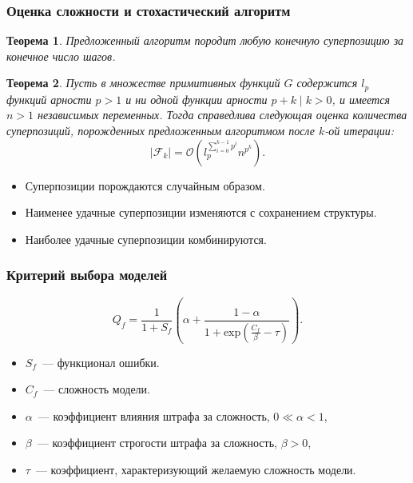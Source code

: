 \documentclass{beamer}
\newtheorem{theo}{Теорема}
\begin{document}
\begin{frame}
  \frametitle{Оценка сложности и стохастический алгоритм}
  
  \begin{theo}
	Предложенный алгоритм породит любую конечную суперпозицию за конечное число шагов.
  \end{theo}

  \begin{theo}
	Пусть в множестве примитивных функций $G$ содержится $l_p$ функций арности
	$p > 1$ и ни одной функции арности $p + k \mid k > 0$, и имеется $n > 1$
	независимых переменных. Тогда справедлива следующая оценка количества
	суперпозиций, порожденных предложенным алгоритмом после $k$-ой итерации:
	\[
	| \mathcal{F}_k | = \mathcal{O} (l_p^{\sum_{i=0}^{k-1} p^i} n^{p^k}).
	\]
  \end{theo}

  \begin{itemize}
	\item Суперпозиции порождаются случайным образом.
	\item Наименее удачные суперпозиции изменяются с сохранением структуры.
	\item Наиболее удачные суперпозиции комбинируются.
  \end{itemize}
\end{frame}

\begin{frame}
  \frametitle{Критерий выбора моделей}

  \[
  Q_f = \frac{1}{1 + S_f} \left(\alpha + \frac{1 - \alpha}{1 + \text{exp} (\frac{C_f}{\beta} - \tau)}\right).
  \]
  \begin{itemize}
	\item $S_f$~--- функционал ошибки.
	\item $C_f$~--- сложность модели.
	\item $\alpha$~--- коэффициент влияния штрафа за сложность, $0 \ll \alpha < 1$,
	\item $\beta$~--- коэффициент строгости штрафа за сложность, $\beta > 0$,
	\item $\tau$~--- коэффициент, характеризующий желаемую сложность модели.
  \end{itemize}
\end{frame}
\end{document}

